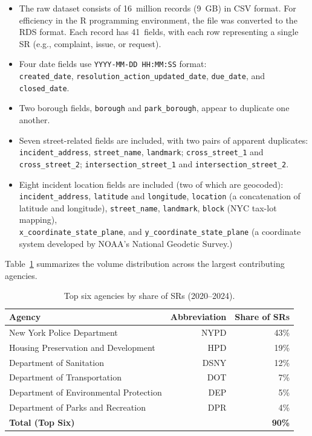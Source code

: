 \documentclass[linenumber]{jdsart}
\begin{document}
\begin{itemize}[left=1.5em]
\item The raw dataset consists of 16~million records (9~GB) in CSV
format. For efficiency in the R programming environment, the file was converted
to the RDS format. Each record has 41~fields, with each row
representing a single SR (e.g., complaint, issue, or request).

\item Four date fields use \texttt{YYYY-MM-DD HH:MM:SS} format:\\
\texttt{created\_date}, \texttt{resolution\_action\_updated\_date}, \texttt{due\_date},
 and \texttt{closed\_date}.

\item Two borough fields, \texttt{borough} and \texttt{park\_borough}, appear
to duplicate one another.

\item Seven street-related fields are included, with two pairs of apparent
duplicates:\\
\texttt{incident\_address}, \texttt{street\_name}, \texttt{landmark};
\texttt{cross\_street\_1} and \texttt{cross\_street\_2};
\texttt{intersection\_street\_1} and \texttt{intersection\_street\_2}.

\item Eight incident location fields are included (two of which are geocoded):\\
\texttt{incident\_address}, \texttt{latitude} and \texttt{longitude},
\texttt{location} (a concatenation of latitude and longitude),
\texttt{street\_name}, \texttt{landmark}, \texttt{block}
(NYC tax-lot mapping), \\
\texttt{x\_coordinate\_state\_plane},
 and  \texttt{y\_coordinate\_state\_plane} (a coordinate system 
 developed by NOAA's National Geodetic Survey.)
\end{itemize}

Table~\ref{tab:big-six-agencies} summarizes the volume distribution across the
largest contributing agencies.

\begin{table}[tbp]
  \centering
  \caption{Top six agencies by share of SRs (2020--2024).}
  \label{tab:big-six-agencies}
  \begin{tabular}{lrr}
    \toprule
    \textbf{Agency} & \textbf{Abbreviation} & \textbf{Share of \textsc{SRs}} \\
    \midrule
    New York Police Department & NYPD & 43\% \\
    Housing Preservation and Development & HPD & 19\% \\
    Department of Sanitation & DSNY & 12\% \\
    Department of Transportation & DOT & 7\% \\
    Department of Environmental Protection & DEP & 5\% \\
    Department of Parks and Recreation & DPR & 4\% \\
    \midrule
    \textbf{Total (Top Six)} &  & \textbf{90\%} \\
    \bottomrule
  \end{tabular}
\end{table}
\end{document}
